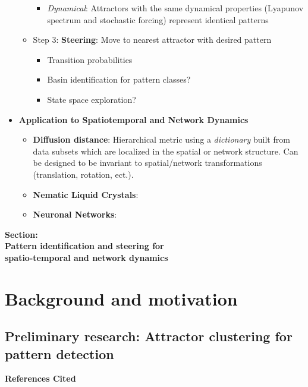 \documentclass[11pt]{article}
\def\bc{\begin{center}}
\def\ec{\end{center}}
\begin{document}
\begin{itemize}
\begin{itemize}
\begin{itemize}
			\item {\it Dynamical}: Attractors with the same dynamical properties (Lyapunov spectrum and stochastic forcing) represent identical patterns
		\end{itemize}
		\item Step 3: {\bf Steering}: Move to nearest attractor with desired pattern
		\begin{itemize}
			\item Transition probabilities
			\item Basin identification for pattern classes?
			\item State space exploration?
		\end{itemize}
	\end{itemize}
	\item {\bf Application to Spatiotemporal and Network Dynamics}
	\begin{itemize}
		\item {\bf Diffusion distance}: Hierarchical metric using a \emph{dictionary} built from data subsets which are localized in the spatial or network structure.  Can be designed to be invariant to spatial/network transformations (translation, rotation, ect.).
		\item {\bf Nematic Liquid Crystals}: 
		\item {\bf Neuronal Networks}: 
	\end{itemize}

\end{itemize}


\newpage

\setcounter{page}{1}

\bc \large\bf  Section: \\ Pattern identification and steering for \\ spatio-temporal and network dynamics

\ec

\section{Background and motivation}



\subsection{Preliminary research: Attractor clustering for pattern detection}



\bc \Large\bf References Cited \ec
\setcounter{page}{1}




\end{document}

